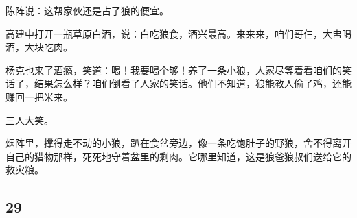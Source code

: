 \par 陈阵说：这帮家伙还是占了狼的便宜。
\par 高建中打开一瓶草原白酒，说：白吃狼食，酒兴最高。来来来，咱们哥仨，大盅喝酒，大块吃肉。
\par 杨克也来了酒瘾，笑道：喝！我要喝个够！养了一条小狼，人家尽等着看咱们的笑话了，结果怎么样？咱们倒看了人家的笑话。他们不知道，狼能教人偷了鸡，还能赚回一把米来。
\par 三人大笑。
\par 烟阵里，撑得走不动的小狼，趴在食盆旁边，像一条吃饱肚子的野狼，舍不得离开自己的猎物那样，死死地守着盆里的剩肉。它哪里知道，这是狼爸狼叔们送给它的救灾粮。





\subsection*{29}




